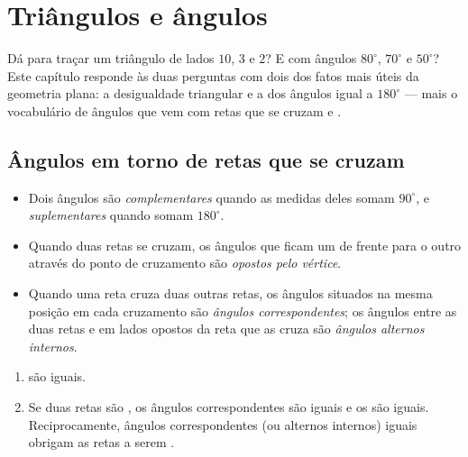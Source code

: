 \chapter{Triângulos e ângulos}\label{ch:g7:triangles}

Dá para traçar um triângulo de lados $10$, $3$ e $2$? E com ângulos
$80^\circ$, $70^\circ$ e $50^\circ$? Este capítulo responde às duas
perguntas com dois dos fatos mais úteis da geometria plana: a
desigualdade triangular e a  dos ângulos igual a $180^\circ$ ---
mais o vocabulário de ângulos que vem com retas que se cruzam e .

\section{Ângulos em torno de retas que se cruzam}

\begin{definition}\label{def:g7:triangles:pairs}
\begin{itemize}
  \item Dois ângulos são \emph{complementares} quando as medidas deles
        somam $90^\circ$, e \emph{suplementares} quando somam
        $180^\circ$.
  \item Quando duas retas se cruzam, os ângulos que ficam um de frente
        para o outro através do ponto de cruzamento são \emph{opostos
        pelo vértice}.
  \item Quando uma reta cruza duas outras retas, os ângulos situados na
        mesma posição em cada cruzamento são \emph{ângulos
        correspondentes}; os ângulos entre as duas retas e em lados
        opostos da reta que as cruza são \emph{ângulos alternos
        internos}.
\end{itemize}
\end{definition}

\begin{theorem}\label{thm:g7:triangles:equalities}
\begin{enumerate}
  \item {} são iguais.
  \item Se duas retas são , os ângulos correspondentes são
        iguais e os  são iguais. Reciprocamente,
        ângulos correspondentes (ou alternos internos) iguais obrigam as
        retas a serem .
\end{enumerate}
\end{theorem}

